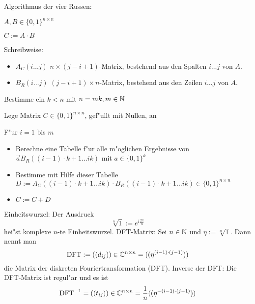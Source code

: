 \algorithm Algorithmus der vier Russen:{
  \given $A,B\in\{0,1\}^{n\times n}$
  
  \aim $C:=A\cdot B$
  
  Schreibweise:
  \begin{itemize}
    \item $A_C(i\ldots j)$ $n\times (j-i+1)$-Matrix, bestehend aus den Spalten 
      $i\ldots j$ von $A$.
    \item $B_R(i\ldots j)$ $(j-i+1)\times n$-Matrix, bestehend aus den Zeilen
      $i\ldots j$ von $A$.
  \end{itemize}
  
  \begin{proc}
    \item Bestimme ein $k<n$ mit $n=mk, m\in\mathbb N$
    \item Lege Matrix $C\in\{0,1\}^{n\times n}$, gef"ullt mit Nullen, an
    \item F"ur $i=1$ bis $m$
      \begin{itemize}
        \item Berechne eine Tabelle f"ur alle m"oglichen Ergebnisse von
          $\vec a B_R((i-1)\cdot k +1\ldots ik)$ mit $a\in\{0,1\}^k$
        \item Bestimme mit Hilfe dieser Tabelle 
          $D:=A_C((i-1)\cdot k +1\ldots ik)\cdot 
              B_R((i-1)\cdot k +1\ldots ik)\in \{0,1\}^{n\times n}$
        \item $C:=C+D$
      \end{itemize}
  \end{proc}
}
 Einheitswurzel:{
  Der Ausdruck
  \[
    \sqrt[n]1:=e^{i\frac{2\pi}n}
  \]
  hei"st komplexe $n$-te Einheitswurzel.
}
 DFT-Matrix:{
  Sei $n\in\mathbb N$ und $\eta:=\sqrt[n]1$. Dann nennt man
  \[
    \operatorname{DFT}:=((d_{ij}))\in\mathbb C^{n\times n}=((\eta^{(i-1)\cdot(j-1)}))
  \]
  die Matrix der diskreten Fouriertransformation (DFT).
}
\remark Inverse der DFT:{
  Die DFT-Matrix ist regul"ar und es ist
  \[
    \operatorname{DFT}^{-1}=((t_{ij}))\in\mathbb C^{n\times n}=\frac 1 n (( \eta^{-(i-1)\cdot(j-1)}))
  \]
}
